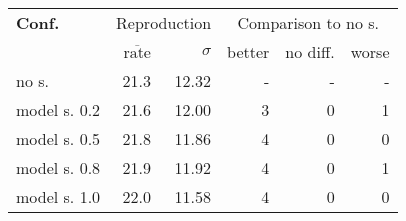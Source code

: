 \begin{tabular}{ l r r | r r r }
\hline 
\textbf{Conf.} & \multicolumn{2}{c|}{Reproduction} & \multicolumn{3}{c}{Comparison to no s.} \\ 
  & $\overline{\text{rate}}$ & $\sigma$ & better & no diff. & worse \\ 
\hline 
no s. & 21.3 & 12.32 & - & - & - \\ 
model s. 0.2 & 21.6 & 12.00 & 3 & 0 & 1 \\ 
model s. 0.5 & 21.8 & 11.86 & 4 & 0 & 0 \\ 
model s. 0.8 & 21.9 & 11.92 & 4 & 0 & 1 \\ 
model s. 1.0 & 22.0 & 11.58 & 4 & 0 & 0 \\ 
\hline 
\end{tabular}